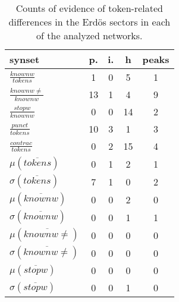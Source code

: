 \begin{table}[h!]
\begin{center}
\begin{tabular}{| l | c | c | c | c |}\hline
synset & p. & i. & h & peaks \\\hline
$\frac{knownw}{tokens}$ & 1  & 0  & 5  & 1 \\\hline
$\frac{knownw \neq}{knownw}$ & 13  & 1  & 4  & 9 \\\hline
$\frac{stopw}{knownw}$ & 0  & 0  & 14  & 2 \\\hline
$\frac{punct}{tokens}$ & 10  & 3  & 1  & 3 \\\hline
$\frac{contrac}{tokens}$ & 0  & 2  & 15  & 4 \\\hline
$\mu(\overline{tokens})$ & 0  & 1  & 2  & 1 \\\hline
$\sigma(\overline{tokens})$ & 7  & 1  & 0  & 2 \\\hline
$\mu(\overline{knownw})$ & 0  & 0  & 2  & 0 \\\hline
$\sigma(\overline{knownw})$ & 0  & 0  & 1  & 1 \\\hline
$\mu(\overline{knownw \neq})$ & 0  & 0  & 0  & 0 \\\hline
$\sigma(\overline{knownw \neq})$ & 0  & 0  & 0  & 0 \\\hline
$\mu(\overline{stopw})$ & 0  & 0  & 0  & 0 \\\hline
$\sigma(\overline{stopw})$ & 0  & 0  & 1  & 0 \\\hline
\end{tabular}
\caption{Counts of evidence of token-related differences in the Erd\"os sectors in each of the analyzed networks.}
\end{center}
\end{table}